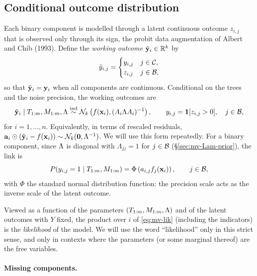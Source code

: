 \subsection{Conditional outcome distribution}

Each binary component is modelled through a latent continuous outcome
$z_{i,j}$ that is observed only through its sign, the probit data
augmentation of Albert and Chib (1993). Define the \emph{working outcome}
$\tilde{\mathbf{y}}_i \in \mathbb{R}^k$ by
\begin{equation}
	\label{eq:mv-working}
	\tilde y_{i,j} =
	\begin{cases}
		y_{i,j} & j \in \mathcal{C}, \\
		z_{i,j} & j \in \mathcal{B},
	\end{cases}
\end{equation}
so that $\tilde{\mathbf{y}}_i = \mathbf{y}_i$ when all components are continuous. Conditional on
the trees and the noise precision, the working outcomes are
\begin{equation}
	\label{eq:mv-lik}
	\tilde{\mathbf{y}}_i \mid T_{1:m}, M_{1:m}, \Lambda \stackrel{\text{ind}}{\sim}
	\mathcal{N}_k\left(f(\mathbf{x}_i), (A_i \Lambda A_i)^{-1}\right),
	\qquad
	y_{i,j} = \mathbf{1}[z_{i,j} > 0], \quad j \in \mathcal{B},
\end{equation}
for $i = 1, \dots, n$. Equivalently, in terms of rescaled residuals,
$\mathbf{a}_i \odot (\tilde{\mathbf{y}}_i - f(\mathbf{x}_i)) \sim \mathcal{N}_k(\mathbf{0}, \Lambda^{-1})$. We will
use this form repeatedly. For a binary component, since $\Lambda$ is diagonal
with $\Lambda_{jj} = 1$ for $j \in \mathcal{B}$ (\S\ref{sec:mv-Lam-prior}), the
link is
\begin{equation}
	\label{eq:mv-probit}
	P(y_{i,j} = 1 \mid T_{1:m}, M_{1:m}) = \Phi\left(a_{i,j} f_j(\mathbf{x}_i)\right),
	\qquad j \in \mathcal{B},
\end{equation}
with $\Phi$ the standard normal distribution function: the precision scale
acts as the inverse scale of the latent outcome.

Viewed as a function of the parameters $(T_{1:m}, M_{1:m}, \Lambda)$ and of the
latent outcomes with $Y$ fixed, the product over $i$ of \eqref{eq:mv-lik}
(including the indicators) is the \emph{likelihood} of the model. We will use
the word ``likelihood'' only in this strict sense, and only in contexts where
the parameters (or some marginal thereof) are the free variables.

\paragraph{Missing components.}

